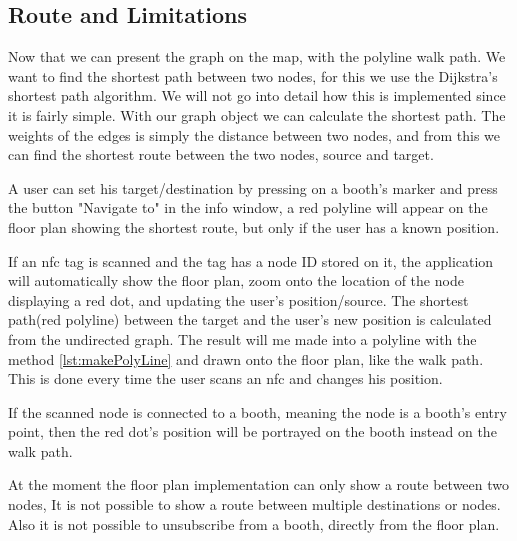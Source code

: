 \subsection*{Route and Limitations}
Now that we can present the graph on the map, with the polyline walk path. We want to find the shortest path between two nodes, for this we use the Dijkstra's shortest path algorithm. We will not go into detail how this is implemented since it is fairly simple. With our graph object we can calculate the shortest path. The weights of the edges is simply the distance between two nodes, and from this we can find the shortest route between the two nodes, source and target.

A user can set his target/destination by pressing on a booth's marker and press the button "Navigate to" in the info window, a red polyline will appear on the floor plan showing the shortest route, but only if the user has a known position.

If an \ac{nfc} tag is scanned and the tag has a node ID stored on it, the application will automatically show the floor plan, zoom onto the location of the node displaying a red dot, and updating the user's position/source. The shortest path(red polyline) between the target and the user's new position is calculated from the undirected graph. The result will me made into a polyline with the method  \autoref{lst:makePolyLine} and drawn onto the floor plan, like the walk path. This is done every time the user scans an \ac{nfc} and changes his position.

If the scanned node is connected to a booth, meaning the node is a booth's entry point, then the red dot's position will be portrayed on the booth instead on the walk path.

At the moment the floor plan implementation can only show a route between two nodes, It is not possible to show a route between multiple destinations or nodes. Also it is not possible to unsubscribe from a booth, directly from the floor plan.







	
